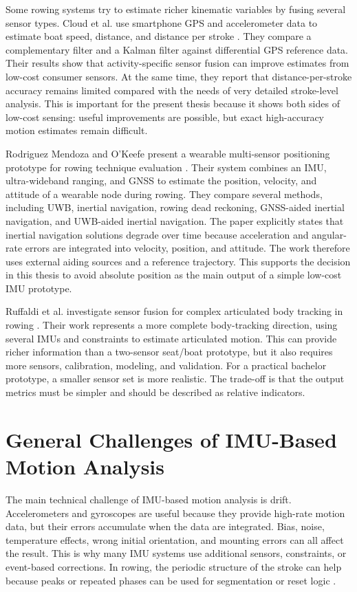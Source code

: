 Some rowing systems try to estimate richer kinematic variables by fusing several sensor types. Cloud et al. use smartphone GPS and accelerometer data to estimate boat speed, distance, and distance per stroke \cite{cloud_adaptive_2019}. They compare a complementary filter and a Kalman filter against differential GPS reference data. Their results show that activity-specific sensor fusion can improve estimates from low-cost consumer sensors. At the same time, they report that distance-per-stroke accuracy remains limited compared with the needs of very detailed stroke-level analysis. This is important for the present thesis because it shows both sides of low-cost sensing: useful improvements are possible, but exact high-accuracy motion estimates remain difficult.

Rodriguez Mendoza and O'Keefe present a wearable multi-sensor positioning prototype for rowing technique evaluation \cite{rodriguez_mendoza_wearable_2024}. Their system combines an IMU, ultra-wideband ranging, and GNSS to estimate the position, velocity, and attitude of a wearable node during rowing. They compare several methods, including UWB, inertial navigation, rowing dead reckoning, GNSS-aided inertial navigation, and UWB-aided inertial navigation. The paper explicitly states that inertial navigation solutions degrade over time because acceleration and angular-rate errors are integrated into velocity, position, and attitude. The work therefore uses external aiding sources and a reference trajectory. This supports the decision in this thesis to avoid absolute position as the main output of a simple low-cost IMU prototype.

Ruffaldi et al. investigate sensor fusion for complex articulated body tracking in rowing \cite{ruffaldi_sensor_2015}. Their work represents a more complete body-tracking direction, using several IMUs and constraints to estimate articulated motion. This can provide richer information than a two-sensor seat/boat prototype, but it also requires more sensors, calibration, modeling, and validation. For a practical bachelor prototype, a smaller sensor set is more realistic. The trade-off is that the output metrics must be simpler and should be described as relative indicators.

\section{General Challenges of IMU-Based Motion Analysis}

The main technical challenge of IMU-based motion analysis is drift. Accelerometers and gyroscopes are useful because they provide high-rate motion data, but their errors accumulate when the data are integrated. Bias, noise, temperature effects, wrong initial orientation, and mounting errors can all affect the result. This is why many IMU systems use additional sensors, constraints, or event-based corrections. In rowing, the periodic structure of the stroke can help because peaks or repeated phases can be used for segmentation or reset logic \cite{cloud_adaptive_2019,rodriguez_mendoza_wearable_2024}.

